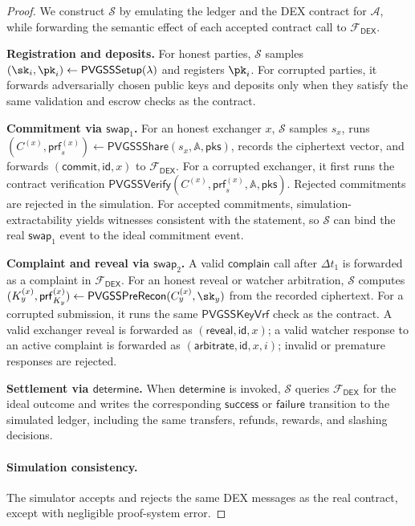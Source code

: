 \documentclass[runningheads]{llncs}
\newcommand{\swapid}{\mathsf{id}}
\newcommand{\success}{\mathsf{success}}
\newcommand{\failure}{\mathsf{failure}}
\newcommand{\pvgssSetup}{\mathsf{PVGSSSetup}}
\newcommand{\pvgssShare}{\mathsf{PVGSSShare}}
\newcommand{\pvgssVerify}{\mathsf{PVGSSVerify}}
\newcommand{\pvgssPreRecon}{\mathsf{PVGSSPreRecon}}
\newcommand{\pvgssKeyVrf}{\mathsf{PVGSSKeyVrf}}
\newcommand{\proofs}{\mathsf{prf}}
\begin{document}
\begin{proof}
We construct \(\mathcal{S}\) by emulating the ledger and the DEX contract for
\(\mathcal{A}\), while forwarding the semantic effect of each accepted contract
call to \(\mathcal{F}_{\mathsf{DEX}}\).

\textbf{Registration and deposits.}
For honest parties, \(\mathcal{S}\) samples
\((\sk_i,\pk_i)\leftarrow\pvgssSetup(\lambda)\) and registers \(\pk_i\). For
corrupted parties, it forwards adversarially chosen public keys and deposits only
when they satisfy the same validation and escrow checks as the contract.

\textbf{Commitment via \(\mathsf{swap}_1\).}
For an honest exchanger \(x\), \(\mathcal{S}\) samples \(s_x\), runs
\((C^{(x)},\proofs_s^{(x)})\gets
\pvgssShare(s_x,\mathbb{A},\mathsf{pks})\), records the ciphertext vector, and
forwards \((\mathsf{commit},\swapid,x)\) to \(\mathcal{F}_{\mathsf{DEX}}\). For a
corrupted exchanger, it first runs the contract verification
\(\pvgssVerify(C^{(x)},\proofs_s^{(x)},\mathbb{A},\mathsf{pks})\). Rejected
commitments are rejected in the simulation. For accepted commitments,
simulation-extractability yields witnesses consistent with the statement, so
\(\mathcal{S}\) can bind the real \(\mathsf{swap}_1\) event to the ideal
commitment event.

\textbf{Complaint and reveal via \(\mathsf{swap}_2\).}
A valid \(\mathsf{complain}\) call after \(\Delta t_1\) is forwarded as a
complaint in \(\mathcal{F}_{\mathsf{DEX}}\). For an honest reveal or watcher
arbitration, \(\mathcal{S}\) computes
\((K_y^{(x)},\proofs_{K_y}^{(x)})\gets
\pvgssPreRecon(C_y^{(x)},\sk_y)\) from the recorded ciphertext. For a corrupted
submission, it runs the same \(\pvgssKeyVrf\) check as the contract. A valid
exchanger reveal is forwarded as \((\mathsf{reveal},\swapid,x)\); a valid watcher
response to an active complaint is forwarded as
\((\mathsf{arbitrate},\swapid,x,i)\); invalid or premature responses are rejected.

\textbf{Settlement via \(\mathsf{determine}\).}
When \(\mathsf{determine}\) is invoked, \(\mathcal{S}\) queries
\(\mathcal{F}_{\mathsf{DEX}}\) for the ideal outcome and writes the corresponding
\(\success\) or \(\failure\) transition to the simulated ledger, including the
same transfers, refunds, rewards, and slashing decisions.

\paragraph{Simulation consistency.}\label{the:consistency}
The simulator accepts and rejects the same DEX messages as the real contract,
except with negligible proof-system error.


\end{proof}
\end{document}
